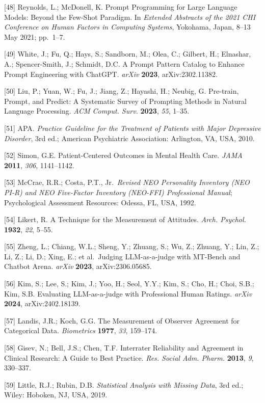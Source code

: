 {[}48{]} Reynolds, L.; McDonell, K. Prompt Programming for Large Language Models: Beyond the Few-Shot Paradigm. In \emph{Extended Abstracts of the 2021 CHI Conference on Human Factors in Computing Systems}, Yokohama, Japan, 8--13 May 2021; pp.~1--7.

{[}49{]} White, J.; Fu, Q.; Hays, S.; Sandborn, M.; Olea, C.; Gilbert, H.; Elnashar, A.; Spencer-Smith, J.; Schmidt, D.C. A Prompt Pattern Catalog to Enhance Prompt Engineering with ChatGPT. \emph{arXiv} \textbf{2023}, arXiv:2302.11382.

{[}50{]} Liu, P.; Yuan, W.; Fu, J.; Jiang, Z.; Hayashi, H.; Neubig, G. Pre-train, Prompt, and Predict: A Systematic Survey of Prompting Methods in Natural Language Processing. \emph{ACM Comput. Surv.} \textbf{2023}, \emph{55}, 1--35.

{[}51{]} APA. \emph{Practice Guideline for the Treatment of Patients with Major Depressive Disorder}, 3rd ed.; American Psychiatric Association: Arlington, VA, USA, 2010.

{[}52{]} Simon, G.E. Patient-Centered Outcomes in Mental Health Care. \emph{JAMA} \textbf{2011}, \emph{306}, 1141--1142.

{[}53{]} McCrae, R.R.; Costa, P.T., Jr.~\emph{Revised NEO Personality Inventory (NEO PI-R) and NEO Five-Factor Inventory (NEO-FFI) Professional Manual}; Psychological Assessment Resources: Odessa, FL, USA, 1992.

{[}54{]} Likert, R. A Technique for the Measurement of Attitudes. \emph{Arch. Psychol.} \textbf{1932}, \emph{22}, 5--55.

{[}55{]} Zheng, L.; Chiang, W.L.; Sheng, Y.; Zhuang, S.; Wu, Z.; Zhuang, Y.; Lin, Z.; Li, Z.; Li, D.; Xing, E.; et al.~Judging LLM-as-a-judge with MT-Bench and Chatbot Arena. \emph{arXiv} \textbf{2023}, arXiv:2306.05685.

{[}56{]} Kim, S.; Lee, S.; Kim, J.; Yoo, H.; Seol, Y.Y.; Kim, S.; Cho, H.; Choi, S.B.; Kim, S.B. Evaluating LLM-as-a-judge with Professional Human Ratings. \emph{arXiv} \textbf{2024}, arXiv:2402.18139.

{[}57{]} Landis, J.R.; Koch, G.G. The Measurement of Observer Agreement for Categorical Data. \emph{Biometrics} \textbf{1977}, \emph{33}, 159--174.

{[}58{]} Gisev, N.; Bell, J.S.; Chen, T.F. Interrater Reliability and Agreement in Clinical Research: A Guide to Best Practice. \emph{Res. Social Adm. Pharm.} \textbf{2013}, \emph{9}, 330--337.

{[}59{]} Little, R.J.; Rubin, D.B. \emph{Statistical Analysis with Missing Data}, 3rd ed.; Wiley: Hoboken, NJ, USA, 2019.

